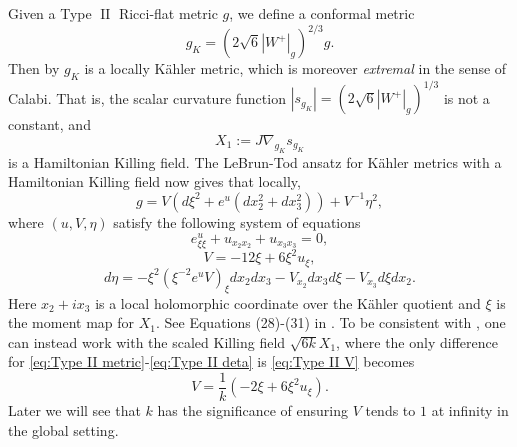 \documentclass[a4paper,11pt]{amsart}
\theoremstyle{definition}
\numberwithin{equation}{section}
\DeclareMathOperator{\II}{II}
\begin{document}
Given a Type $\II$ Ricci-flat metric $g$,  we define a conformal metric 
$$g_K=(2\sqrt{6}|W^+|_g)^{2/3}g.$$
Then by \cite{Der} $g_K$ is a locally K\"ahler metric, which is moreover \emph{extremal} in the sense of Calabi. That is, the scalar curvature function $|s_{g_K}|=(2\sqrt{6}|W^+|_g)^{1/3}$ is not a constant, and  
    $$X_1:=J\nabla_{g_K}s_{g_K}$$ 
is a Hamiltonian Killing field. The LeBrun-Tod ansatz for K\"ahler metrics with a Hamiltonian Killing field now gives that locally,
\begin{equation}\label{eq:Type II metric}
    g=V(d\xi^2+e^u(dx_2^2+dx_3^2))+V^{-1}\eta^2,
\end{equation}
where $(u, V, \eta)$ satisfy the following system of equations
\begin{equation}\label{eq:Toda}
    e^u_{\xi\xi}+u_{x_2x_2}+u_{x_3x_3}=0,
\end{equation}
\begin{equation}\label{eq:Type II V}
    V=-12\xi+6\xi^2u_{\xi},
\end{equation}
\begin{equation}\label{eq:Type II deta}
    d\eta=-\xi^2(\xi^{-2}e^uV)_\xi dx_2dx_3-V_{x_2}dx_3d\xi-V_{x_3}d\xi dx_2.
\end{equation}
Here $x_2+ix_3$ is a local holomorphic coordinate over the K\"ahler quotient and $\xi$ is the moment map for $X_1$. See Equations (28)-(31) in \cite{BG}. To be consistent with \cite{BG}, one can instead work with the scaled Killing field $\sqrt{6k}X_1$, where the only difference for \eqref{eq:Type II metric}-\eqref{eq:Type II deta} is \eqref{eq:Type II V} becomes 
\begin{equation}\label{eq:Type II scaled V}
    V=\frac{1}{k}(-2\xi+6\xi^2u_\xi).
\end{equation}
Later we will see that $k$ has the significance of ensuring $V$ tends to $1$ at infinity in the global setting.
\end{document}
